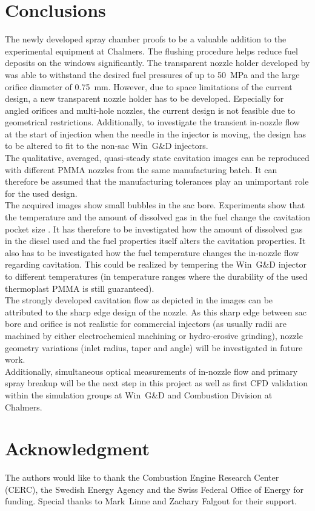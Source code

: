 \documentclass[letterpaper,twocolumn,10pt]{ilass}
\begin{document}
\section*{Conclusions}
The newly developed spray chamber proofs to be a valuable addition to the experimental equipment
at Chalmers. The flushing procedure helps reduce fuel deposits on the windows significantly.
The transparent nozzle holder developed by \cite{Falgout2015} was able to withstand the desired
fuel pressures of up to 50~MPa and the large orifice diameter of 0.75~mm. However, due to space
limitations of the current design, a new transparent nozzle holder has to be developed.
Especially for angled orifices and multi-hole nozzles, the current design is not feasible due
to geometrical restrictions. Additionally, to investigate the transient in-nozzle flow at the
start of injection when the needle in the injector is moving, the design has to be altered to
fit to the non-sac Win~G\&D injectors.\\
%
The qualitative, averaged, quasi-steady state cavitation images can be reproduced with different
PMMA nozzles from the same manufacturing batch. It can therefore be assumed that the
manufacturing tolerances play an unimportant role for the used design.\\
%
The acquired images show small bubbles in the sac bore. Experiments show that the temperature
and the amount of dissolved gas in the fuel change the cavitation pocket size
\cite{Watanabe2014}.
It has therefore to be investigated how the amount of dissolved gas in the diesel used and
the fuel properties itself alters the cavitation properties. It also has to be investigated
how the fuel temperature changes the in-nozzle flow regarding cavitation. This could be realized
by tempering the Win~G\&D injector to different temperatures (in temperature ranges where the
durability of the used thermoplast PMMA is still guaranteed).\\
%
The strongly developed cavitation flow as depicted in the images can be attributed to the
sharp edge design of the nozzle. As this sharp edge between sac bore and orifice is not
realistic for commercial injectors (as usually radii are machined by either electrochemical
machining or hydro-erosive grinding), nozzle geometry variations (inlet radius, taper and angle)
will be investigated in future work.\\
%
Additionally, simultaneous optical measurements of in-nozzle flow and primary spray breakup
will be the next step in this project as well as first CFD validation within the simulation
groups at Win~G\&D and Combustion Division at Chalmers.
%



\section*{Acknowledgment}
The authors would like to thank the Combustion Engine Research Center (CERC),
the Swedish Energy Agency and the Swiss Federal Office of Energy for funding.
Special thanks to Mark~Linne and Zachary Falgout for their support.




\end{document}
